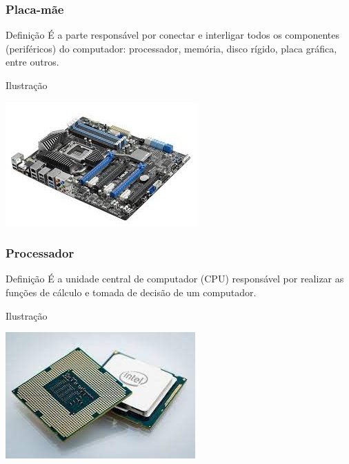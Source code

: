 \documentclass[aspectratio=169]{beamer} %
\begin{document}
\begin{frame}
	\frametitle{Placa-mãe}
	
	\begin{block}{Defini\c cão}
		É a parte responsável por conectar e interligar todos os componentes (periféricos) do computador: processador, memória, disco rígido, placa gráfica, entre outros.
	\end{block}\vfill
	
	\begin{exampleblock}{Ilustra\c cão}
		\begin{center}
			\includegraphics[scale=0.4]{img/placa-mae}
		\end{center}			
	\end{exampleblock}
\end{frame}

\begin{frame}
	\frametitle{Processador}
	
	\begin{block}{Defini\c cão}
		É a unidade central de computador (CPU) responsável por realizar as funções de cálculo e tomada de decisão de um computador.
	\end{block}\vfill
	
	\begin{exampleblock}{Ilustra\c cão}
		\begin{center}
			\includegraphics[scale=0.4]{img/processador}
		\end{center}
	\end{exampleblock}
\end{frame}
\end{document}
